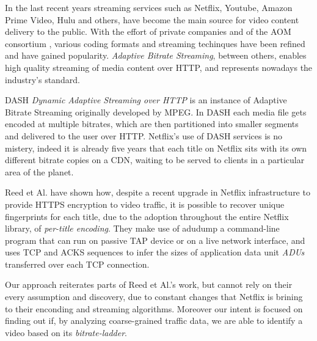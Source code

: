 
In the last recent years streaming services such as Netflix, Youtube, Amazon
Prime Video, Hulu and others, have become the main source for video content
delivery to the public. With the effort of private companies and of the AOM
consortium \cite{aom}, various coding formats and streaming techinques have
been refined and have gained popularity. \textit{Adaptive Bitrate Streaming},
between others, enables high quality streaming of media content over HTTP, and
represents nowadays the industry's standard. 

DASH \textit{Dynamic Adaptive Streaming over HTTP} is an instance of Adaptive
Bitrate Streaming originally developed by MPEG. In DASH each media file gets
encoded at multiple bitrates, which are then partitioned into smaller segments
and delivered to the user over HTTP.  Netflix's use of DASH services is no
mistery, indeed it is already five years that each title on Netflix sits with
its own different bitrate copies on a CDN, waiting to be served to clients in a
particular area of the planet. \cite{per-title-encoding}

Reed et Al. \cite{netflix-real-time} have shown how, despite a recent upgrade
in Netflix infrastructure to provide HTTPS encryption to video traffic, it is
possible to recover unique fingerprints for each title, due to the adoption
throughout the entire Netflix library, of \emph{per-title encoding}. They make
use of adudump \cite{adudump} a command-line program that can run on passive
TAP device \cite{tap} or on a live network interface, and uses TCP and ACKS
sequences to infer the sizes of application data unit \emph{ADUs} transferred
over each TCP connection. 

Our approach reiterates parts of Reed et Al.'s work, but cannot rely on their
every assumption and discovery, due to constant changes that Netflix is brining
to their enconding and streaming algorithms. Moreover our intent is focused on
finding out if, by analyzing coarse-grained traffic data, we are able to
identify a video based on its \emph{bitrate-ladder}.

